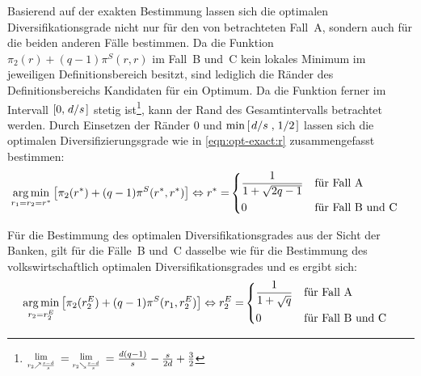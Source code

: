 Basierend auf der exakten Bestimmung lassen sich die optimalen Diversifikationsgrade nicht nur für den von \citeauthor{Wagner-2010} betrachteten Fall~A, sondern auch für die beiden anderen Fälle bestimmen. Da die Funktion $\pi_2(r) + (q-1)\pi^S(r,r)$ im Fall~B und~C kein lokales Minimum im jeweiligen Definitionsbereich besitzt, sind lediglich die Ränder des Definitionsbereichs Kandidaten für ein Optimum. Da die Funktion ferner im Intervall $\left[0,\flatfrac{d}{s}\right]$ stetig ist\footnote{$\Lim{r_2\nearrow\frac{s-d}{s}}=\Lim{r_2\searrow\frac{s-d}{s}}=\frac{d (q-1)}{s}-\frac{s}{2 d}+\frac{3}{2}$}, kann der Rand des Gesamtintervalls betrachtet werden. Durch Einsetzen der Ränder 0 und $\min\left[\flatfrac{d}{s},\flatfrac{1}{2}\right]$ lassen sich die optimalen Diversifizierungsgrade wie in \cref{eqn:opt-exact:r} zusammengefasst bestimmen:
%
{\small
\begin{align}
	\operatorname*{arg\,min}_{r_1=r_2=r^\ast}\left[\pi_2(r^\ast) + (q-1)\pi^S(r^\ast,r^\ast)\right] \Leftrightarrow r^\ast = & \begin{dcases}
	                                                                                                              \frac{1}{1+\sqrt{2q-1}} & \text{für Fall~A}       \\
	                                                                                                              0                       & \text{für Fall~B und~C}
	                                                                                                          \end{dcases} \label{eqn:opt-exact:r}
\end{align}}

Für die Bestimmung des optimalen Diversifikationsgrades aus der Sicht der Banken, gilt für die Fälle~B und~C dasselbe wie für die Bestimmung des volkswirtschaftlich optimalen Diversifikationsgrades und es ergibt sich:
%
{\small
\begin{align}
	\operatorname*{arg\,min}_{r_2=r^E_2}\left[\pi_2(r^E_2) + (q-1)\pi^S(r_1,r^E_2)\right] \Leftrightarrow r^E_2 = & \begin{dcases}
	                                                                                                   \frac{1}{1+\sqrt{q}} & \text{für Fall~A}       \\
	                                                                                                   0                    & \text{für Fall~B und~C}
	                                                                                               \end{dcases} \label{eqn:opt-exact:r2}
\end{align}}

